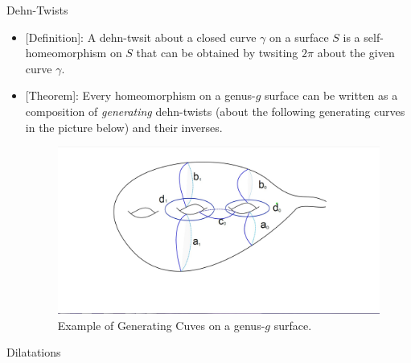 \documentclass[leqno,presentation]{beamer}
\begin{document}
\begin{frame}
\begin{columns}[t]
\begin{column}{.25\linewidth}

\begin{block}{Dehn-Twists}
	\vspace{1ex}
	\begin{itemize}
		\item {[Definition]}: A dehn-twsit about a closed curve $\gamma$ on a surface $S$ is a self-homeomorphism on $S$ that can be obtained by twsiting $2\pi$ about the given curve $\gamma$.

		\item {[Theorem]}: Every homeomorphism on a genus-$g$ surface can be written as a composition of \textit{generating} dehn-twists (about the following generating curves in the picture below) and their inverses.
		\vspace{1ex}
		\begin{figure}[h]
			\begin{center}
				\includegraphics[width=11in]{Ex_Dehn-Twist_Generating_Curves.jpg}
				\caption{Example of Generating Cuves on a genus-$g$ surface.}
			\end{center}
		\end{figure}
	\end{itemize}
\end{block}

\begin{block}{Dilatations}

\end{block}


\end{column}
\end{columns}
\end{frame}
\end{document}
